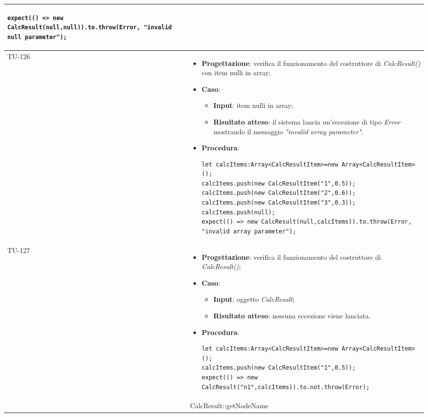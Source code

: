 \begin{longtable}{|C{1.5cm}|C{14.5cm}|}
\begin{itemize}
\begin{lstlisting}
expect(() => new CalcResult(null,null)).to.throw(Error, "invalid null parameter");
	\end{lstlisting}
\end{itemize}\\
\hline
{TU-126} &
\begin{itemize}
	\item \textbf{Progettazione}: verifica il funzionamento del costruttore di \emph{CalcResult()} con item nulli in array;
	\item \textbf{Caso}: 
	\begin{itemize}
		\item \textbf{Input}: item nulli in array;
		\item \textbf{Risultato atteso}: il sistema lancia un'eccezione di tipo \emph{Error} mostrando il messaggio \emph{"invalid array parameter"}.
	\end{itemize}
	\item \textbf{Procedura}:
	\begin{lstlisting}
let calcItems:Array<CalcResultItem>=new Array<CalcResultItem>();
calcItems.push(new CalcResultItem("1",0.5));
calcItems.push(new CalcResultItem("2",0.6));
calcItems.push(new CalcResultItem("3",0.3));
calcItems.push(null);
expect(() => new CalcResult(null,calcItems)).to.throw(Error, "invalid array parameter");
	\end{lstlisting}
\end{itemize}\\
\hline
{TU-127} &
\begin{itemize}
	\item \textbf{Progettazione}: verifica il funzionamento del costruttore di \emph{CalcResult()};
	\item \textbf{Caso}: 
	\begin{itemize}
		\item \textbf{Input}: oggetto \emph{CalcResult};
		\item \textbf{Risultato atteso}: nessuna eccezione viene lanciata.
	\end{itemize}
	\item \textbf{Procedura}:
	\begin{lstlisting}
let calcItems:Array<CalcResultItem>=new Array<CalcResultItem>();
calcItems.push(new CalcResultItem("1",0.5));
expect(() => new CalcResult("n1",calcItems)).to.not.throw(Error);
	\end{lstlisting}
\end{itemize}\\
\hline
{} & CalcResult::getNodeName

\end{longtable}
